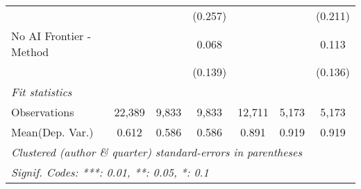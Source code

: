 \begin{tabular}{lcccccc}
                           &               &               & (0.257)      &               &               & (0.211)\\   
   No AI Frontier - Method &               &               & 0.068        &               &               & 0.113\\   
                           &               &               & (0.139)      &               &               & (0.136)\\   
   \midrule
   \emph{Fit statistics}\\
   Observations            & 22,389        & 9,833         & 9,833        & 12,711        & 5,173         & 5,173\\  
Mean(Dep. Var.) & 0.612 & 0.586 & 0.586 & 0.891 & 0.919 & 0.919 \\
   \midrule \midrule
   \multicolumn{7}{l}{\emph{Clustered (author \& quarter) standard-errors in parentheses}}\\
   \multicolumn{7}{l}{\emph{Signif. Codes: ***: 0.01, **: 0.05, *: 0.1}}\\
\end{tabular}
\par\endgroup
